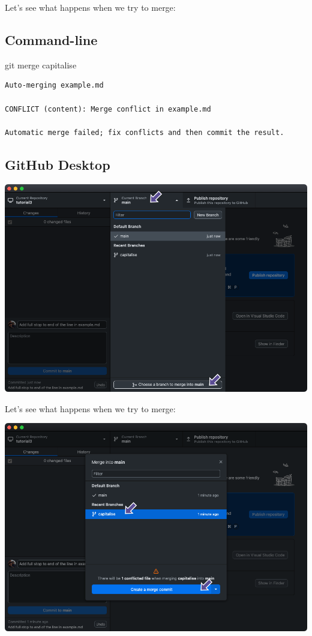 \documentclass[
  letterpaper,
  DIV=11,
  numbers=noendperiod]{scrartcl}
\newenvironment{Shaded}{\begin{snugshade}}{\end{snugshade}}
\newcommand{\FunctionTok}[1]{\textcolor[rgb]{0.28,0.35,0.67}{#1}}
\newcommand{\NormalTok}[1]{\textcolor[rgb]{0.00,0.23,0.31}{#1}}
\begin{document}
Let's see what happens when we try to merge:

\subsection{Command-line}

\begin{Shaded}
\begin{Highlighting}[]
\FunctionTok{git}\NormalTok{ merge capitalise}
\end{Highlighting}
\end{Shaded}

\begin{verbatim}
Auto-merging example.md

CONFLICT (content): Merge conflict in example.md

Automatic merge failed; fix conflicts and then commit the result.
\end{verbatim}

\subsection{GitHub Desktop}

\includegraphics{images/image51.png}

Let's see what happens when we try to merge:

\includegraphics{images/image52.png}
\end{document}

